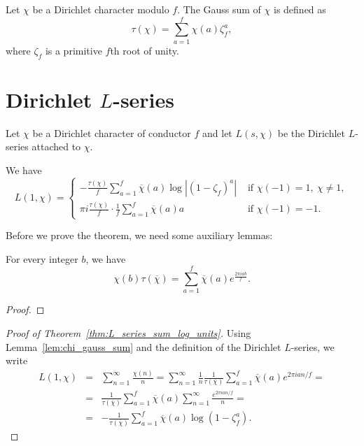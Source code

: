 \begin{definition}\label{defn:gauss_sum}
    \leanok
    Let $\chi$ be a Dirichlet character modulo $f$. The Gauss sum of $\chi$ is defined as 
    $$
    \tau(\chi) = \sum_{a = 1}^f \chi(a) \zeta_f^a,
    $$
    where $\zeta_f$ is a primitive $f$th root of unity.
\end{definition}

\section{Dirichlet $L$-series}

Let $\chi$ be a Dirichlet character of conductor $f$ and let $L(s, \chi)$ 
be the Dirichlet $L$-series attached to $\chi$.

\begin{theorem}\label{thm:L_series_sum_log_units}
    We have 
    $$
    L(1, \chi) = 
    \begin{cases}
    -\frac{\tau(\chi)}{f} \sum_{a = 1}^{f} \overline{\chi}(a) \log | (1 - \zeta_f)^a | & \text{ if } \chi(-1) = 1, \ \chi \ne 1, \\
    \pi i \frac{\tau(\chi)}{f} \cdot \frac{1}{f} \sum_{a = 1}^f \overline{\chi}(a)a & \text{ if } \chi(-1) = -1. 
    \end{cases}
    $$
\end{theorem}

Before we prove the theorem, we need some auxiliary lemmas: 

\begin{lemma}\label{lem:chi_gauss_sum}
    For every integer $b$, we have 
    $$
    \chi(b) \tau(\overline{\chi}) = \sum_{a = 1}^f \overline{\chi}(a) e^{\frac{2\pi i a b}{f}}.
    $$
\end{lemma}

\begin{proof}
\end{proof}

\begin{proof}[Proof of Theorem~\ref{thm:L_series_sum_log_units}]
    Using Lemma~\ref{lem:chi_gauss_sum} and the definition of the Dirichlet $L$-series, we write 
    \begin{eqnarray*}
        L(1, \chi) &=& \sum_{n = 1}^{\infty} \frac{\chi(n)}{n} = \sum_{n = 1}^{\infty} \frac{1}{n} \frac{1}{\tau(\overline{\chi})} \sum_{a = 1}^f \overline{\chi}(a) e^{2\pi i a n / f} = \\
        &=& \frac{1}{\tau(\overline{\chi})} \sum_{a = 1}^f \overline{\chi}(a) \sum_{n = 1}^{\infty} \frac{e^{2\pi i a n / f}}{n} = \\
        &=& - \frac{1}{\tau(\overline{\chi})} \sum_{a = 1}^f \overline{\chi}(a) \log(1 - \zeta_f^a).
    \end{eqnarray*}
\end{proof}


